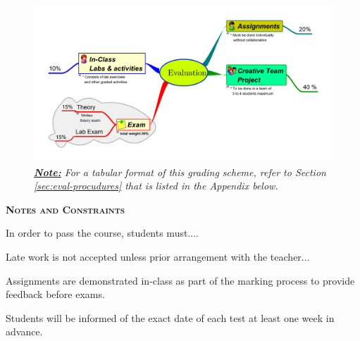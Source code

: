 \documentclass[11pt, a4paper]{article}
\begin{document}
\begin{figure}[htbp]
    \centering                   
    \includegraphics[scale=0.47]{includes/mindmap/A21-Evaluation-420-408.png}
    \vspace{-1.3cm}
    \caption*{
        \small\textit{
            \textbf{\underline{Note:}}
            For a tabular format of this grading scheme, refer to Section \ref{sec:eval-procudures} that is listed in the Appendix below.
        }
    } 
\end{figure}
    
\noindent \textsc{\large\textbf{Notes and Constraints}}
\vspbpara
\begin{arrows}
\item In order to pass the course, students must....
\item Late work is not accepted unless prior arrangement with the teacher...
\item Assignments are demonstrated in-class as part of the marking process to provide feedback before exams. 
\item Students will be informed of the exact date of each test at least one week in advance.
\end{arrows}

\clearpage
\end{document}
